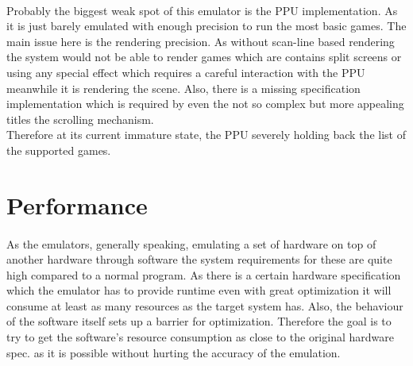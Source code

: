 \documentclass[]{report}
\begin{document}
\paragraph{ }
Probably the biggest weak spot of this emulator is the PPU implementation. As it is just barely emulated with enough precision to run the most basic games. The main issue here is the rendering precision. As without scan-line based rendering the system would not be able to render games which are contains split screens or using any special effect which requires a careful interaction with the PPU meanwhile it is rendering the scene. Also, there is a missing specification implementation which is required by even the not so complex but more appealing titles the scrolling mechanism.
\\
Therefore at its current immature state, the PPU severely holding back the list of the supported games.

\section{Performance}
\paragraph{ }
As the emulators, generally speaking, emulating a set of hardware on top of another hardware through software the system requirements for these are quite high compared to a normal program. As there is a certain hardware specification which the emulator has to provide runtime even with great optimization it will consume at least as many resources as the target system has. Also, the behaviour of the software itself sets up a barrier for optimization. Therefore the goal is to try to get the software's resource consumption as close to the original hardware spec. as it is possible without hurting the accuracy of the emulation.
\end{document}
